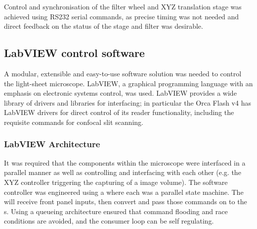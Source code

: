 Control and synchronisation of the filter wheel and XYZ translation stage was achieved using \gls{RS232} serial commands, as precise timing was not needed and direct feedback on the status of the stage and filter was desirable. %

%



\subsection{\gls{LabVIEW} control software}

A modular, extensible and easy-to-use software solution was needed to control the \gls{light-sheet} microscope.
\gls{LabVIEW}, a graphical programming language with an emphasis on electronic systems control, was used.
\gls{LabVIEW} provides a wide library of drivers and libraries for interfacing; in particular the Orca Flash v4 has \gls{LabVIEW} drivers for direct control of its reader functionality, including the requisite commands for confocal slit scanning.

\subsubsection{\gls{LabVIEW} Architecture}


It was required that the components within the microscope were interfaced in a parallel manner as well as controlling and interfacing with each other (e.g. the XYZ controller triggering the capturing of a image volume).
The software controller was engineered using a  where each  was a parallel \gls{state machine}.
The  will receive front panel inputs, then convert and pass those commands on to the s.
Using a \gls{queueing architecture} ensured that command flooding and \gls{race conditions} are avoided, and the consumer loop can be self regulating.

